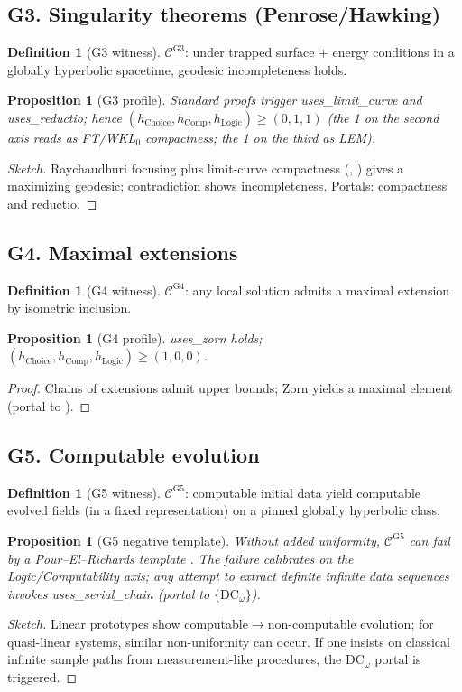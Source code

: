 \documentclass[11pt]{article}
\newtheorem{proposition}[theorem]{Proposition}
\theoremstyle{definition}
\newtheorem{definition}[theorem]{Definition}
\theoremstyle{remark}
\newcommand{\AC}{\mathrm{AC}}
\newcommand{\DCw}{\mathrm{DC}_\omega}
\newcommand{\hChoice}{h_{\mathrm{Choice}}}    %
\newcommand{\hComp}{h_{\mathrm{Comp}}}        %
\newcommand{\hLogic}{h_{\mathrm{Logic}}}      %
\begin{document}
\subsection*{G3. Singularity theorems (Penrose/Hawking)}
\begin{definition}[G3 witness]
$\mathcal{C}^{\mathrm{G3}}$: under trapped surface + energy conditions in a globally hyperbolic spacetime, geodesic incompleteness holds.
\end{definition}
\begin{proposition}[G3 profile]\label{prop:G3}
Standard proofs trigger \textsf{uses\_limit\_curve} and \textsf{uses\_reductio}; hence $(\hChoice,\hComp,\hLogic)\ge(0,1,1)$ (the 1 on the second axis reads as FT/WKL\(_0\) compactness; the 1 on the third as LEM).
\end{proposition}
\begin{proof}[Sketch]
Raychaudhuri focusing plus limit-curve compactness (\cite[§8]{HawkingEllis1973}, \cite[§14]{Wald1984}) gives a maximizing geodesic; contradiction shows incompleteness. Portals: compactness and reductio.
\end{proof}

\subsection*{G4. Maximal extensions}
\begin{definition}[G4 witness]
$\mathcal{C}^{\mathrm{G4}}$: any local solution admits a maximal extension by isometric inclusion.
\end{definition}
\begin{proposition}[G4 profile]\label{prop:G4}
\textsf{uses\_zorn} holds; $(\hChoice,\hComp,\hLogic)\ge(1,0,0)$.
\end{proposition}
\begin{proof}
Chains of extensions admit upper bounds; Zorn yields a maximal element (portal to \AC).
\end{proof}

\subsection*{G5. Computable evolution}
\begin{definition}[G5 witness]
$\mathcal{C}^{\mathrm{G5}}$: computable initial data yield computable evolved fields (in a fixed representation) on a pinned globally hyperbolic class.
\end{definition}
\begin{proposition}[G5 negative template]\label{prop:G5}
Without added uniformity, $\mathcal{C}^{\mathrm{G5}}$ can fail by a Pour--El--Richards template \cite{PourElRichards1989}. The failure calibrates on the Logic/Computability axis; any attempt to extract definite infinite data sequences invokes \textsf{uses\_serial\_chain} (portal to $\{\DCw\}$).
\end{proposition}
\begin{proof}[Sketch]
Linear prototypes show computable$\to$non-computable evolution; for quasi-linear systems, similar non-uniformity can occur. If one insists on classical infinite sample paths from measurement-like procedures, the $\DCw$ portal is triggered.
\end{proof}
\end{document}
